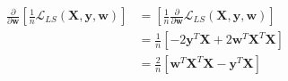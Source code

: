 \newcommand{\matrix}[1]{\mathbf{#1}}
\newcommand{\vector}[1]{\mathbf{#1}}
\newcommand{\X}{\matrix{X}}
\newcommand{\y}{\vector{y}}
\newcommand{\w}{\vector{w}}
\begin{align*}
\frac{\partial}{\partial \w} \left[ \frac{1}{n} \mathcal{L}_{LS}(\X,\y,\w) \right] &= \left[ \frac{1}{n} \frac{\partial}{\partial \w} \mathcal{L}_{LS}(\X,\y,\w) \right] \\
&= \frac{1}{n} \left[ -2\y^T\X + 2\w^T\X^T\X \right] \\
&= \frac{2}{n} \left[ \w^T\X^T\X - \y^T\X \right]
\end{align*}
